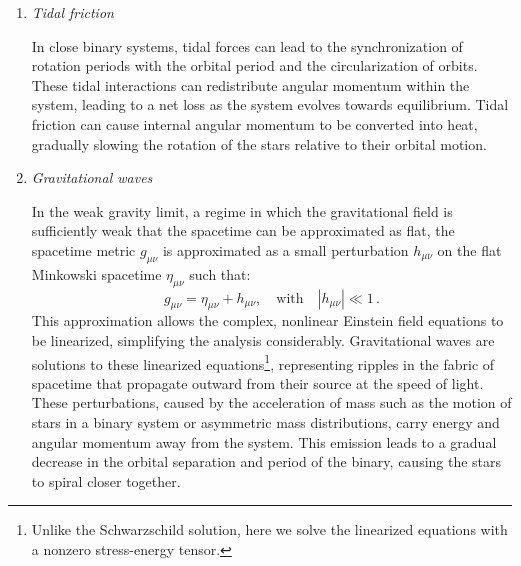 \documentclass[main.tex]{subfiles}
\begin{document}
\begin{enumerate}
        \item \textit{Tidal friction}
        
        In close binary systems, tidal forces can lead to the synchronization of rotation periods with the orbital period and the circularization of orbits. These tidal interactions can redistribute angular momentum within the system, leading to a net loss as the system evolves towards equilibrium. Tidal friction can cause internal angular momentum to be converted into heat, gradually slowing the rotation of the stars relative to their orbital motion.

        \item \textit{Gravitational waves}

        In the weak gravity limit, a regime in which the gravitational field is sufficiently weak that the spacetime can be approximated as flat, the spacetime metric $g_{\mu \nu}$ is approximated as a small perturbation $h_{\mu \nu}$ on the flat Minkowski spacetime $\eta_{\mu \nu}$ such that:
        \begin{equation}\label{eq:weak_gravity_limit}
            g_{\mu \nu} = \eta_{\mu \nu} + h_{\mu \nu},\quad \text{with}\quad |h_{\mu \nu}| \ll 1\,.
        \end{equation}
        This approximation allows the complex, nonlinear Einstein field equations to be linearized, simplifying the analysis considerably. Gravitational waves are solutions to these linearized equations\footnote{Unlike the Schwarzschild solution, here we solve the linearized equations with a nonzero stress-energy tensor.}, representing ripples in the fabric of spacetime that propagate outward from their source at the speed of light. These perturbations, caused by the acceleration of mass such as the motion of stars in a binary system or asymmetric mass distributions, carry energy and angular momentum away from the system. This emission leads to a gradual decrease in the orbital separation and period of the binary, causing the stars to spiral closer together.
    \end{enumerate}
\end{document}
